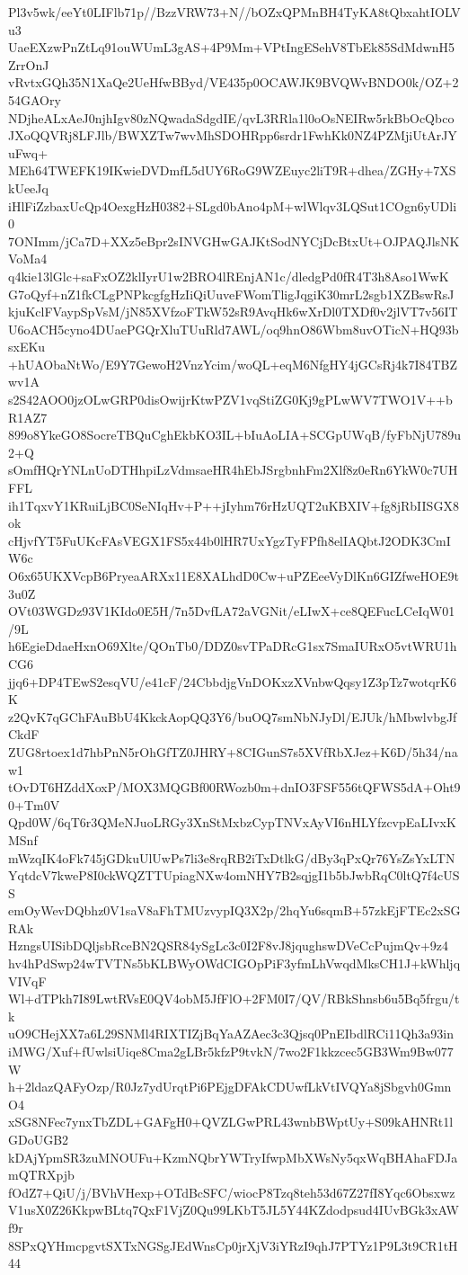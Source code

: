 Pl3v5wk/eeYt0LIFlb71p//BzzVRW73+N//bOZxQPMnBH4TyKA8tQbxahtIOLVu3
UaeEXzwPnZtLq91ouWUmL3gAS+4P9Mm+VPtIngESehV8TbEk85SdMdwnH5ZrrOnJ
vRvtxGQh35N1XaQe2UeHfwBByd/VE435p0OCAWJK9BVQWvBNDO0k/OZ+254GAOry
NDjheALxAeJ0njhIgv80zNQwadaSdgdIE/qvL3RRla1l0oOsNEIRw5rkBbOcQbco
JXoQQVRj8LFJlb/BWXZTw7wvMhSDOHRpp6srdr1FwhKk0NZ4PZMjiUtArJYuFwq+
MEh64TWEFK19IKwieDVDmfL5dUY6RoG9WZEuyc2liT9R+dhea/ZGHy+7XSkUeeJq
iHlFiZzbaxUcQp4OexgHzH0382+SLgd0bAno4pM+wlWlqv3LQSut1COgn6yUDli0
7ONImm/jCa7D+XXz5eBpr2sINVGHwGAJKtSodNYCjDcBtxUt+OJPAQJlsNKVoMa4
q4kie13lGlc+saFxOZ2klIyrU1w2BRO4lREnjAN1c/dledgPd0fR4T3h8Aso1WwK
G7oQyf+nZ1fkCLgPNPkcgfgHzIiQiUuveFWomTligJqgiK30mrL2sgb1XZBswRsJ
kjuKclFVaypSpVsM/jN85XVfzoFTkW52sR9AvqHk6wXrDl0TXDf0v2jlVT7v56IT
U6oACH5cyno4DUaePGQrXluTUuRld7AWL/oq9hnO86Wbm8uvOTicN+HQ93bsxEKu
+hUAObaNtWo/E9Y7GewoH2VnzYcim/woQL+eqM6NfgHY4jGCsRj4k7I84TBZwv1A
s2S42AOO0jzOLwGRP0disOwijrKtwPZV1vqStiZG0Kj9gPLwWV7TWO1V++bR1AZ7
899o8YkeGO8SocreTBQuCghEkbKO3IL+bIuAoLIA+SCGpUWqB/fyFbNjU789u2+Q
sOmfHQrYNLnUoDTHhpiLzVdmsaeHR4hEbJSrgbnhFm2Xlf8z0eRn6YkW0c7UHFFL
ih1TqxvY1KRuiLjBC0SeNIqHv+P++jIyhm76rHzUQT2uKBXIV+fg8jRbIISGX8ok
cHjvfYT5FuUKcFAsVEGX1FS5x44b0lHR7UxYgzTyFPfh8elIAQbtJ2ODK3CmIW6c
O6x65UKXVcpB6PryeaARXx11E8XALhdD0Cw+uPZEeeVyDlKn6GIZfweHOE9t3u0Z
OVt03WGDz93V1KIdo0E5H/7n5DvfLA72aVGNit/eLIwX+ce8QEFucLCeIqW01/9L
h6EgieDdaeHxnO69Xlte/QOnTb0/DDZ0svTPaDRcG1sx7SmaIURxO5vtWRU1hCG6
jjq6+DP4TEwS2esqVU/e41cF/24CbbdjgVnDOKxzXVnbwQqsy1Z3pTz7wotqrK6K
z2QvK7qGChFAuBbU4KkckAopQQ3Y6/buOQ7smNbNJyDl/EJUk/hMbwlvbgJfCkdF
ZUG8rtoex1d7hbPnN5rOhGfTZ0JHRY+8CIGunS7s5XVfRbXJez+K6D/5h34/naw1
tOvDT6HZddXoxP/MOX3MQGBf00RWozb0m+dnIO3FSF556tQFWS5dA+Oht90+Tm0V
Qpd0W/6qT6r3QMeNJuoLRGy3XnStMxbzCypTNVxAyVI6nHLYfzcvpEaLIvxKMSnf
mWzqIK4oFk745jGDkuUlUwPs7li3e8rqRB2iTxDtlkG/dBy3qPxQr76YsZsYxLTN
YqtdcV7kweP8I0ckWQZTTUpiagNXw4omNHY7B2sqjgI1b5bJwbRqC0ltQ7f4cUSS
emOyWevDQbhz0V1saV8aFhTMUzvypIQ3X2p/2hqYu6sqmB+57zkEjFTEc2xSGRAk
HzngsUISibDQljsbRceBN2QSR84ySgLc3c0I2F8vJ8jqughswDVeCcPujmQv+9z4
hv4hPdSwp24wTVTNs5bKLBWyOWdCIGOpPiF3yfmLhVwqdMksCH1J+kWhljqVIVqF
Wl+dTPkh7I89LwtRVsE0QV4obM5JfFlO+2FM0I7/QV/RBkShnsb6u5Bq5frgu/tk
uO9CHejXX7a6L29SNMl4RIXTIZjBqYaAZAec3c3Qjsq0PnEIbdlRCi11Qh3a93in
iMWG/Xuf+fUwlsiUiqe8Cma2gLBr5kfzP9tvkN/7wo2F1kkzcec5GB3Wm9Bw077W
h+2ldazQAFyOzp/R0Jz7ydUrqtPi6PEjgDFAkCDUwfLkVtIVQYa8jSbgvh0GmnO4
xSG8NFec7ynxTbZDL+GAFgH0+QVZLGwPRL43wnbBWptUy+S09kAHNRt1lGDoUGB2
kDAjYpmSR3zuMNOUFu+KzmNQbrYWTryIfwpMbXWsNy5qxWqBHAhaFDJamQTRXpjb
fOdZ7+QiU/j/BVhVHexp+OTdBcSFC/wiocP8Tzq8teh53d67Z27fI8Yqc6Obsxwz
V1usX0Z26KkpwBLtq7QxF1VjZ0Qu99LKbT5JL5Y44KZdodpsud4IUvBGk3xAWf9r
8SPxQYHmcpgvtSXTxNGSgJEdWnsCp0jrXjV3iYRzI9qhJ7PTYz1P9L3t9CR1tH44
